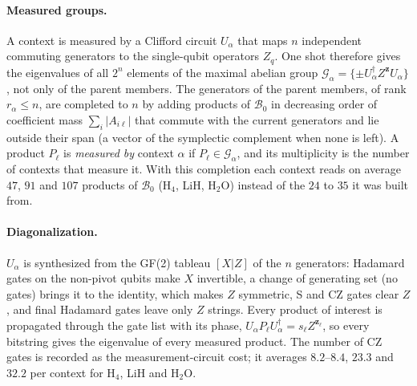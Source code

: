 \documentclass[aps,pra,reprint,superscriptaddress,nofootinbib]{revtex4-2}
\begin{document}
\paragraph{Measured groups.} A context is measured by a Clifford circuit $U_\alpha$ that maps $n$ independent commuting generators to the single-qubit operators $Z_q$. One shot therefore gives the eigenvalues of all $2^n$ elements of the maximal abelian group $\mathcal G_\alpha=\{\pm U_\alpha^\dagger Z^{\bm z}U_\alpha\}$, not only of the parent members. The generators of the parent members, of rank $r_\alpha\le n$, are completed to $n$ by adding products of $\mathcal B_0$ in decreasing order of coefficient mass $\sum_i\lvert A_{i\ell}\rvert$ that commute with the current generators and lie outside their span (a vector of the symplectic complement when none is left). A product $P_\ell$ is \emph{measured by} context $\alpha$ if $P_\ell\in\mathcal G_\alpha$, and its multiplicity is the number of contexts that measure it. With this completion each context reads on average $47$, $91$ and $107$ products of $\mathcal B_0$ (H$_4$, LiH, H$_2$O) instead of the $24$ to $35$ it was built from.

\paragraph{Diagonalization.} $U_\alpha$ is synthesized from the GF(2) tableau $[X\vert Z]$ of the $n$ generators: Hadamard gates on the non-pivot qubits make $X$ invertible, a change of generating set (no gates) brings it to the identity, which makes $Z$ symmetric, S and CZ gates clear $Z$, and final Hadamard gates leave only $Z$ strings. Every product of interest is propagated through the gate list with its phase, $U_\alpha P_\ell U_\alpha^\dagger=s_\ell Z^{\bm z_\ell}$, so every bitstring gives the eigenvalue of every measured product. The number of CZ gates is recorded as the measurement-circuit cost; it averages $8.2$--$8.4$, $23.3$ and $32.2$ per context for H$_4$, LiH and H$_2$O.
\end{document}
